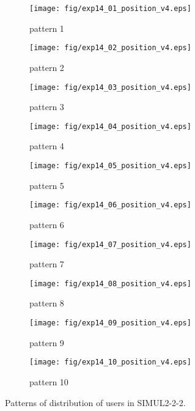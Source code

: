 \begin{figure}
	\begin{center}
		\begin{subfigure}[b]{0.32\textwidth}
			\texttt{[image: fig/exp14\_01\_position\_v4.eps]}
			\caption{pattern 1}
			\label{figure:simul2_2_2_a}
		\end{subfigure}
		\begin{subfigure}[b]{0.32\textwidth}
			\texttt{[image: fig/exp14\_02\_position\_v4.eps]}
			\caption{pattern 2}
			\label{figure:simul2_2_2_b}
		\end{subfigure}
		\begin{subfigure}[b]{0.32\textwidth}
			\texttt{[image: fig/exp14\_03\_position\_v4.eps]}
			\caption{pattern 3}
			\label{figure:simul2_2_2_c}
		\end{subfigure}
		\begin{subfigure}[b]{0.32\textwidth}
			\texttt{[image: fig/exp14\_04\_position\_v4.eps]}
			\caption{pattern 4}
			\label{figure:simul2_2_2_d}
		\end{subfigure}
		\begin{subfigure}[b]{0.32\textwidth}
			\texttt{[image: fig/exp14\_05\_position\_v4.eps]}
			\caption{pattern 5}
			\label{figure:simul2_2_2_e}
		\end{subfigure}
		\begin{subfigure}[b]{0.32\textwidth}
			\texttt{[image: fig/exp14\_06\_position\_v4.eps]}
			\caption{pattern 6}
			\label{figure:simul2_2_2_f}
		\end{subfigure}
		\begin{subfigure}[b]{0.32\textwidth}
			\texttt{[image: fig/exp14\_07\_position\_v4.eps]}
			\caption{pattern 7}
			\label{figure:simul2_2_2_g}
		\end{subfigure}
		\begin{subfigure}[b]{0.32\textwidth}
			\texttt{[image: fig/exp14\_08\_position\_v4.eps]}
			\caption{pattern 8}
			\label{figure:simul2_2_2_h}
		\end{subfigure}
		\begin{subfigure}[b]{0.32\textwidth}
			\texttt{[image: fig/exp14\_09\_position\_v4.eps]}
			\caption{pattern 9}
			\label{figure:simul2_2_2_i}
		\end{subfigure}
		\begin{subfigure}[b]{0.32\textwidth}
			\texttt{[image: fig/exp14\_10\_position\_v4.eps]}
			\caption{pattern 10}
			\label{figure:simul2_2_2_j}
		\end{subfigure}
		\caption{Patterns of distribution of users in SIMUL2-2-2.}
		\label{figure:simul2_2_2_p}
	\end{center}
\end{figure}

